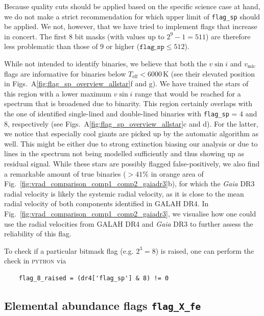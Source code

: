 \documentclass[
  journal=pasa,
  manuscript=research-paper, %
  year=2024,
  volume=37
]{cup-journal}
\newcommand{\vmic}{$v_\mathrm{mic}$\xspace}
\newcommand{\vsini}{$v \sin i$\xspace}
\newcommand{\Gaia}{\textit{Gaia}\xspace}
\begin{document}
Because quality cuts should be applied based on the specific science case at hand, we do not make a strict recommendation for which upper limit of \texttt{flag\_sp} should be applied. We not, however, that we have tried to implement flags that increase in concert. The first 8 bit masks (with values up to $2^9-1 = 511$) are therefore less problematic than those of 9  or higher ($\texttt{flag\_sp} \leq 512$).



While not intended to identify binaries, we believe that both the \vsini and \vmic flags are informative for binaries below $T_\mathrm{eff} < 6000\,\mathrm{K}$ (see their elevated position in Figs.~A\ref{fig:flag_sp_overview_allstar}f and g). We have trained the stars of this region with a lower maximum \vsini range that would be reached for a spectrum that is broadened due to binarity. This region certainly overlaps with the one of identified single-lined and double-lined binaries with \texttt{flag\_sp} = 4 and 8, respectively (see Figs.~A\ref{fig:flag_sp_overview_allstar}c and d). For the latter, we notice that especially cool giants are picked up by the automatic algorithm as well. This might be either due to strong extinction biasing our analysis or due to lines in the spectrum not being modelled sufficiently and thus showing up as residual signal. While these stars are possibly flagged false-positively, we also find a remarkable amount of true binaries ($>41\%$ in orange area of Fig.~\ref{fig:vrad_comparison_comp1_comp2_gaiadr3}b), for which the \Gaia DR3 radial velocity is likely the systemic radial velocity, as it is close to the mean radial velocity of both components identified in GALAH DR4. In Fig.~\ref{fig:vrad_comparison_comp1_comp2_gaiadr3}, we visualise how one could use the radial velocities from GALAH DR4 and \Gaia DR3 to further assess the reliability of this flag.


To check if a particular bitmask flag (e.g. $2^3 = 8$) is raised, one can perform the check in \textsc{python} via
\begin{verbatim}
    flag_8_raised = (dr4['flag_sp'] & 8) != 0
\end{verbatim}

\subsection{Elemental abundance flags \texttt{flag\_X\_fe}}
\label{sec:flag_x_fe}
\end{document}
